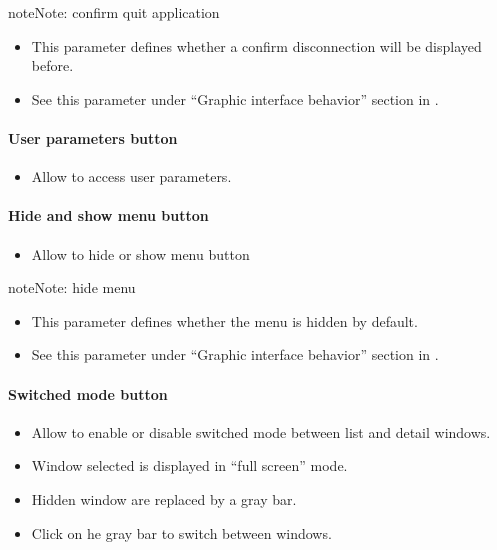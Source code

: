 \documentclass[letterpaper,10pt,english]{sphinxmanual}
\begin{document}
\begin{notice}{note}{Note:}
confirm quit application
\begin{itemize}
\item {} 
This parameter defines whether a confirm disconnection will be displayed before.

\item {} 
See this parameter under ``Graphic interface behavior'' section in {\hyperref[UserParameter:user-parameters-label]{\emph{}}}.

\end{itemize}
\end{notice}
\paragraph{User parameters button}
\begin{itemize}
\item {} 
Allow to access user parameters.

\end{itemize}
\paragraph{Hide and show menu button}
\begin{itemize}
\item {} 
Allow to hide or show menu button

\end{itemize}

\begin{notice}{note}{Note:}
hide menu
\begin{itemize}
\item {} 
This parameter defines whether the menu is hidden by default.

\item {} 
See this parameter under ``Graphic interface behavior'' section in {\hyperref[UserParameter:user-parameters-label]{\emph{}}}.

\end{itemize}
\end{notice}
\paragraph{Switched mode button}
\begin{itemize}
\item {} 
Allow to enable or disable switched mode between list and detail windows.

\item {} 
Window selected is displayed in ``full screen'' mode.

\item {} 
Hidden window are replaced by a gray bar.

\item {} 
Click on he gray bar to switch between windows.

\end{itemize}
\end{document}
